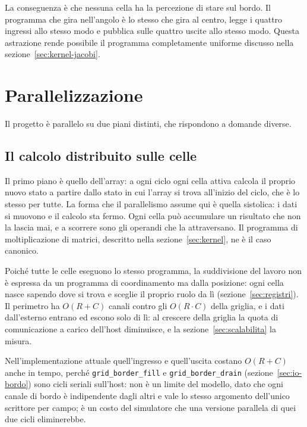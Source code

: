 La conseguenza è che nessuna cella ha la percezione di stare sul bordo. Il programma
che gira nell'angolo è lo stesso che gira al centro, legge i quattro ingressi
allo stesso modo e pubblica sulle quattro uscite allo stesso modo. Questa
astrazione rende possibile il programma completamente uniforme discusso
nella sezione~\ref{sec:kernel-jacobi}.


\section{Parallelizzazione}
\label{sec:parallelizzazione}

Il progetto è parallelo su due piani distinti, che rispondono a domande diverse.

\subsection{Il calcolo distribuito sulle celle}

Il primo piano è quello dell'array: a ogni ciclo ogni cella attiva calcola il
proprio nuovo stato a partire dallo stato in cui l'array si trova all'inizio del
ciclo, che è lo stesso per tutte.
La forma che il parallelismo assume qui è quella sistolica: i dati si
muovono e il calcolo sta fermo. Ogni cella può accumulare un risultato che non
la lascia mai, e a scorrere sono gli operandi che la attraversano. Il programma
di moltiplicazione di matrici, descritto nella sezione~\ref{sec:kernel}, ne è
il caso canonico.

Poiché tutte le celle eseguono lo stesso programma, la suddivisione
del lavoro non è espressa da un programma di coordinamento ma dalla posizione:
ogni cella nasce sapendo dove si trova e sceglie il proprio ruolo da lì
(sezione~\ref{sec:registri}). Il perimetro ha $O(R+C)$ canali contro gli
$O(R \cdot C)$ della griglia, e i dati dall'esterno entrano ed escono solo di
lì: al crescere della griglia la quota di comunicazione a carico dell'host
diminuisce, e la sezione~\ref{sec:scalabilita} la misura.

Nell'implementazione attuale quell'ingresso e quell'uscita costano $O(R+C)$
anche in tempo, perché \texttt{grid\_border\_fill} e \texttt{grid\_border\_drain}
(sezione~\ref{sec:io-bordo}) sono cicli seriali sull'host: non è un limite del
modello, dato che ogni canale di bordo è indipendente dagli altri e vale lo
stesso argomento dell'unico scrittore per campo; è un costo del simulatore che
una versione parallela di quei due cicli eliminerebbe.

